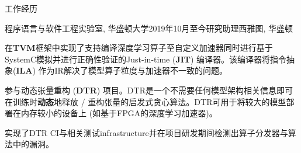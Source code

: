 \documentclass{resume}
\begin{document}
	\begin{rSection}{工作经历}



		\begin{rSubsection}{程序语言与软件工程实验室, 华盛顿大学}{2019年10月至今}{研究助理}{西雅图, 华盛顿} 
			\item 在\textbf{TVM}框架中实现了支持编译深度学习算子至自定义加速器同时进行基于SystemC模拟并进行正确性验证的Just-in-time (\textbf{JIT}) 编译器。该编译器将指令抽象(\textbf{ILA}) 作为IR解决了模型算子粒度与加速器不一致的问题。
			\item 参与动态张量重构 (\textbf{DTR}) 项目。DTR是一个不需要任何模型架构相关信息即可在训练时\textbf{动态}地释放 / 重构张量的启发式贪心算法。DTR可用于将较大的模型部署在内存较小的设备上 (如基于FPGA的深度学习加速器)。
			\item 实现了DTR CI与相关测试infrastructure并在项目研发期间检测出算子分发器与算法中的漏洞。
		\end{rSubsection}


\end{rSection}
\end{document}
